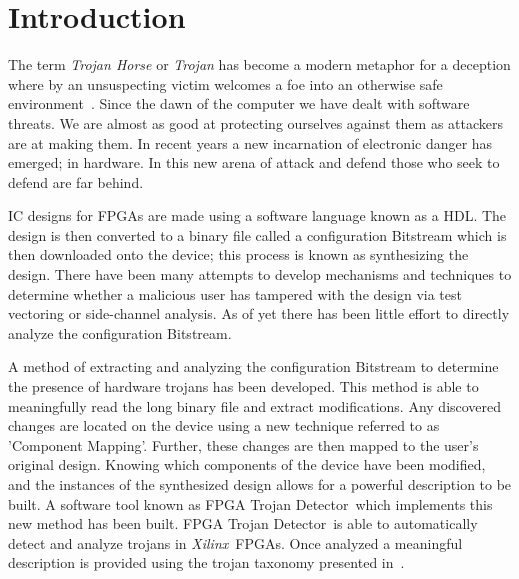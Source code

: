 \documentclass[conference]{IEEEtran}
\newcommand{\Xilinx}{\textit{\gls{Xilinx}}~}
\newcommand{\Name}{\acrshort{FPGA} Trojan Detector}
\newcommand{\NameNoPeriod}{\Name~}
\begin{document}




%
\IEEEpeerreviewmaketitle



\section{Introduction}
The term \textit{Trojan Horse} or \textit{Trojan} has become a modern metaphor for a deception where by an unsuspecting victim welcomes a foe into an otherwise safe environment~\cite{searchForTrojanWar}.
Since the dawn of the computer we have dealt with software threats.
We are almost as good at protecting ourselves against them as attackers are at making them.
In recent years a new incarnation of electronic danger has emerged; in hardware.
In this new arena of attack and defend those who seek to defend are far behind.

\acrfull{IC} designs for \acrfull{FPGAs} are made using a software language known as a \acrfull{HDL}.
The design is then converted to a binary file called a configuration \gls{Bitstream} which is then downloaded onto the device; this process is known as synthesizing the design.
There have been many attempts to develop mechanisms and techniques to determine whether a malicious user has tampered with the design via test vectoring or side-channel analysis.
As of yet there has been little effort to directly analyze the configuration \gls{Bitstream}.

A method of extracting and analyzing the configuration \gls{Bitstream} to determine the presence of hardware trojans has been developed.
This method is able to meaningfully read the long binary file and extract modifications.
Any discovered changes are located on the device using a new technique referred to as 'Component Mapping'.
Further, these changes are then mapped to the user's original design.
Knowing which components of the device have been modified, and the instances of the synthesized design allows for a powerful description to be built.
A software tool known as \NameNoPeriod which implements this new method has been built. 
\NameNoPeriod is able to automatically detect and analyze trojans in \Xilinx \acrshort{FPGAs}.
Once analyzed a meaningful description is provided using the trojan taxonomy presented in~\cite{samerAttribute}.
\end{document}
